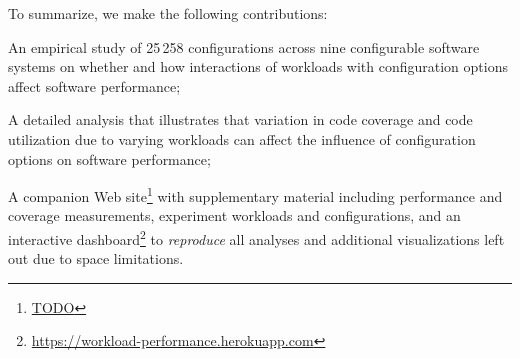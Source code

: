 To summarize, we make the following contributions: 
\begin{compactitem}
	\item An empirical study of 25\,258 configurations across nine configurable software systems on whether and how interactions of workloads with configuration options affect software  performance;
	
	\item A detailed analysis that illustrates that variation in code coverage and code utilization due to varying workloads can affect the influence of configuration options on software performance; 
	
	\item A companion Web site\footnote{\color{red}\url{TODO}} with supplementary material including performance and coverage measurements, experiment workloads and configurations, and an interactive dashboard\footnote{\url{https://workload-performance.herokuapp.com}} to \textit{reproduce} all analyses and additional visualizations left out due to space limitations.
	
\end{compactitem}


